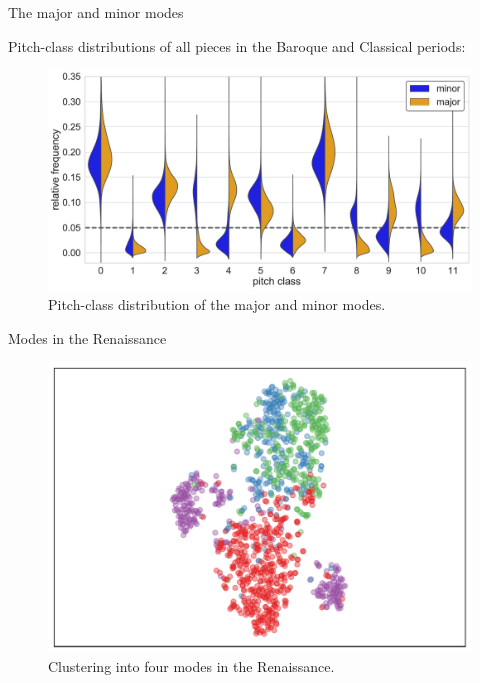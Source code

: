 \begin{frame}{The major and minor modes}

    Pitch-class distributions of all pieces in the Baroque and Classical periods:

    \begin{figure}
        \centering
        \includegraphics[width=\linewidth,height=.7\textheight,keepaspectratio]{img/Figure8.pdf}
        \caption{Pitch-class distribution of the major and minor modes.}
    \end{figure}
\end{frame}

\begin{frame}{Modes in the Renaissance}
    \begin{figure}
        \centering
        \includegraphics[width=\linewidth,height=.7\textheight,keepaspectratio]{img/Figure6.pdf}
        \caption{Clustering into four modes in the Renaissance.}
    \end{figure}
\end{frame}

